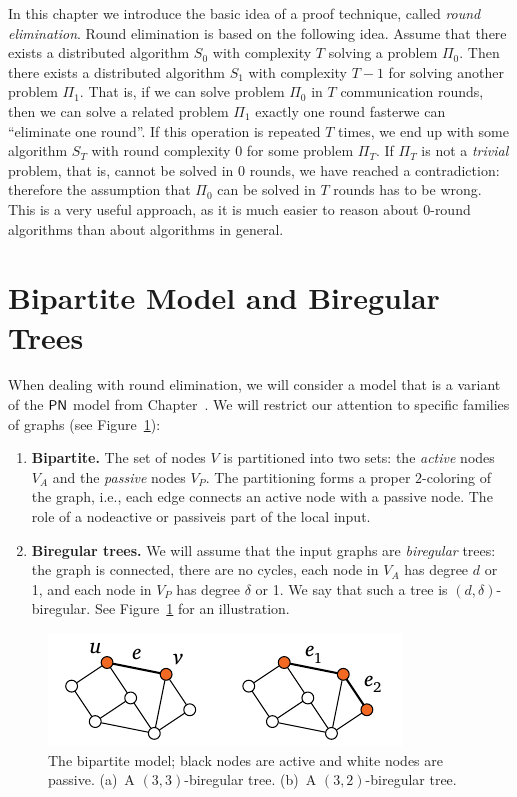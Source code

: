

\noindent
In this chapter we introduce the basic idea of a proof technique, called \emph{round elimination}.
Round elimination is based on the following idea. Assume that there exists a distributed algorithm $S_0$ with complexity $T$ solving a problem $\Pi_0$. Then there exists a distributed algorithm $S_1$ with complexity $T-1$ for solving another problem $\Pi_1$. That is, if we can solve problem $\Pi_0$ in $T$ communication rounds, then we can solve a related problem $\Pi_1$ exactly one round faster\mydash we can ``eliminate one round''. If this operation is repeated $T$ times, we end up with some algorithm $S_T$ with round complexity $0$ for some problem $\Pi_T$. If $\Pi_T$ is not a \emph{trivial} problem, that is, cannot be solved in $0$ rounds, we have reached a contradiction: therefore the assumption that $\Pi_0$ can be solved in $T$ rounds has to be wrong. This is a very useful approach, as it is much easier to reason about $0$-round algorithms than about algorithms in general.

\section{Bipartite Model and Biregular Trees}

When dealing with round elimination, we will consider a model that is a variant of the $\textup{\sffamily PN}$ model from Chapter~. We will restrict our attention to specific families of graphs (see Figure~\ref{fig:biregular}):
\begin{enumerate}
	\item \textbf{Bipartite.} The set of nodes $V$ is partitioned into two sets: the \emph{active} nodes $V_A$ and the \emph{passive} nodes $V_P$. The partitioning forms a proper $2$-coloring of the graph, i.e., each edge connects an active node with a passive node. The role of a node\mydash active or passive\mydash is part of the local input.
	\item \textbf{Biregular trees.} We will assume that the input graphs are \emph{biregular} trees: the graph is connected, there are no cycles, each node in $V_A$ has degree $d$ or 1, and each node in $V_P$ has degree $\delta$ or 1. We say that such a tree is $(d,\delta)$-biregular. See Figure~\ref{fig:biregular} for an illustration.
\end{enumerate}

\begin{figure}
	\centering
	\includegraphics[page=\PBipartiteModel,scale=0.33]{figs.pdf}
	\caption{The bipartite model; black nodes are active and white nodes are passive. (a)~A $(3,3)$-biregular tree. (b)~A $(3,2)$-biregular tree.} \label{fig:biregular}
\end{figure}

